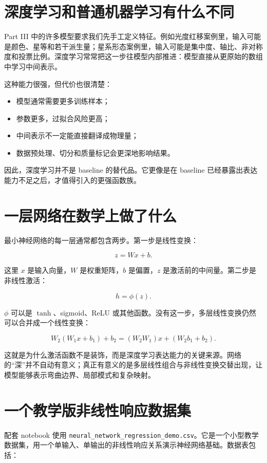 \section{深度学习和普通机器学习有什么不同}

Part III 中的许多模型要求我们先手工定义特征。例如光度红移案例里，输入可能是颜色、星等和若干派生量；星系形态案例里，输入可能是集中度、轴比、非对称度和投票比例。深度学习常常把这一步往模型内部推进：模型直接从更原始的数组中学习中间表示。

这种能力很强，但代价也很清楚：

\begin{itemize}
    \item 模型通常需要更多训练样本；
    \item 参数更多，过拟合风险更高；
    \item 中间表示不一定能直接翻译成物理量；
    \item 数据预处理、切分和质量标记会更深地影响结果。
\end{itemize}

因此，深度学习并不是 baseline 的替代品。它更像是在 baseline 已经暴露出表达能力不足之后，才值得引入的更强函数族。

\section{一层网络在数学上做了什么}

最小神经网络的每一层通常都包含两步。第一步是线性变换：

\[
z = Wx + b.
\]

这里 \(x\) 是输入向量，\(W\) 是权重矩阵，\(b\) 是偏置，\(z\) 是激活前的中间量。第二步是非线性激活：

\[
h = \phi(z).
\]

\(\phi\) 可以是 \(\tanh\)、sigmoid、ReLU 或其他函数。没有这一步，多层线性变换仍然可以合并成一个线性变换：

\[
W_2(W_1x + b_1) + b_2 = (W_2W_1)x + (W_2b_1 + b_2).
\]

这就是为什么激活函数不是装饰，而是深度学习表达能力的关键来源。网络的“深”并不自动有意义；真正有意义的是多层线性组合与非线性变换交替出现，让模型能够表示弯曲边界、局部模式和复杂映射。

\section{一个教学版非线性响应数据集}

配套 notebook 使用 \nolinkurl{neural_network_regression_demo.csv}。它是一个小型教学数据集，用一个单输入、单输出的非线性响应关系演示神经网络基础。数据表包括：

